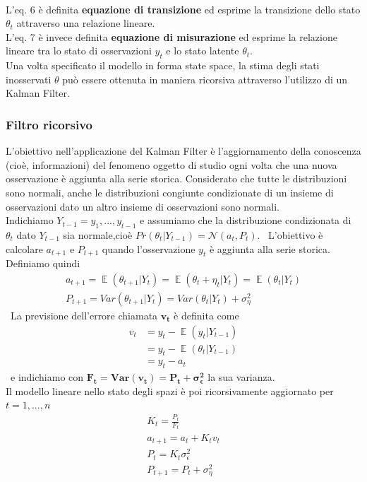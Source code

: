 \documentclass[]{article}
\DeclareMathOperator{\E}{\mathbb{E}}
\begin{document}
\
\\
L'eq. 6 è definita \textbf{equazione di transizione} ed esprime la transizione dello stato $\theta_t$ attraverso una relazione lineare.
\\
L'eq. 7 è invece definita \textbf{equazione di misurazione} ed esprime la relazione lineare tra lo stato di osservazioni $y_t$ e lo stato latente $\theta_t$.
\\
Una volta specificato il modello in forma state space, la stima degli stati inosservati $\theta$ può essere ottenuta in maniera ricorsiva attraverso l'utilizzo di un Kalman Filter.
\\

\subsubsection{Filtro ricorsivo}
L’obiettivo nell’applicazione del Kalman Filter è l’aggiornamento
della conoscenza (cioè, informazioni) del fenomeno oggetto di studio
ogni volta che una nuova osservazione è aggiunta alla serie storica.
Considerato che tutte le distribuzioni sono normali, anche le
distribuzioni congiunte condizionate di un insieme di osservazioni
dato un altro insieme di osservazioni sono normali.
\\
Indichiamo $Y_{t-1} = {y_1,...,y_{t-1}}$ e assumiamo che la distribuzione condizionata di $\theta_t$ dato $Y_{t-1}$ sia normale,cioè $Pr(\theta_t|Y_{t-1})= \mathcal{N}(a_t,P_t)$.
\
L'obiettivo è calcolare $a_{t+1}$ e $P_{t+1}$ quando l'osservazione $y_t$ è aggiunta alla serie storica.
Definiamo quindi
\begin{align}
	a_{t+1} = \E(\theta_{t+1}|Y_t) = \E(\theta_t + \eta_t| Y_t) = \E(\theta_t|Y_t) 
	\\
	P_{t+1} = Var(\theta_{t+1}|Y_t) = Var(\theta_t|Y_t) + \sigma_{\eta}^2
\end{align}
\
La previsione dell'errore chiamata  $\mathbf{v_t}$ è definita come
\begin{equation}
	\begin{split}
		v_t & = y_t - \E(y_t|Y_{t-1})    \\
		& = y_t - \E(\theta_t|Y_{t-1}) \\
		& = y_t - a_t
	\end{split}
\end{equation}
\
e indichiamo con $\mathbf{F_t= Var(v_t)= P_t + \sigma_{\epsilon}^2}$ la sua varianza.
\\
Il modello lineare nello stato degli spazi è poi ricorsivamente aggiornato per $t=1,...,n$ 
\begin{gather*}
	 K_t = \frac{P_t}{F_t}
	 \\
	 a_{t+1} = a_t + K_tv_t
	 \\
	 P_t = K_t\sigma_{\epsilon}^2
	 \\
	 P_{t+1} = P_t + \sigma_{\eta}^2
\end{gather*}
\end{document}
